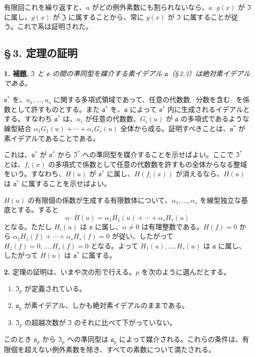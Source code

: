 有限回これを繰り返すと、$a$ がどの例外素数にも割られないなら、$a\cdot g(x)$ が $\mathfrak{I}$ に属し、$g(x)$ が $\mathfrak{Z}$ に属することから、常に $g(x)$ が $\mathfrak{I}$ に属することが従う。これで系は証明された。

\subsection*{\S\,3. 定理の証明}

\noindent\textbf{1. 補題.}
\emph{$\mathfrak{I}$ と $\mathfrak{o}$ の間の準同型を媒介する素イデアル $\mathfrak{a}$（\S\,2.3）は絶対素イデアルである。}

$\mathfrak{o}^*$ を、$u_1,\ldots,u_s$ に関する多項式領域であって、任意の代数数 --分数を含む-- を係数として許すものとする。また $\mathfrak{a}^*$ を、$\mathfrak{a}$ によって $\mathfrak{o}^*$ 内に生成されるイデアルとする。すなわち $\mathfrak{a}^*$ は、$\alpha_i$ が任意の代数数、$G_i(u)$ が $\mathfrak{a}$ の多項式であるような線型結合 $\alpha_1G_1(u)+\cdots+\alpha_sG_s(u)$ 全体から成る。証明すべきことは、$\mathfrak{a}^*$ が素イデアルであることである。

これは、$\mathfrak{a}^*$ が $\mathfrak{o}^*$ から $\mathfrak{I}^*$ への準同型を媒介することを示せばよい。ここで $\mathfrak{I}^*$ とは、$f_i(x)$ の多項式で係数として任意の代数数を許すもの全体からなる整域をいう。すなわち、$H(u)$ が $\mathfrak{o}^*$ に属し、$H(f_i(x))$ が消えるなら、$H(u)$ は $\mathfrak{a}^*$ に属することを示せばよい。

$H(u)$ の有限個の係数が生成する有限数体について、$\alpha_1,\ldots,\alpha_s$ を線型独立な基底とする。すると
\[
\alpha\cdot H(u)=\alpha_1H_1(u)+\cdots+\alpha_sH_s(u)
\]
となる。ただし $H_i(u)$ は $\mathfrak{o}$ に属し、$\alpha\ne0$ は有理整数である。$H(f)=0$ から
$\alpha_1H_1(f)+\cdots+\alpha_sH_s(f)=0$ が従い、したがって $H_1(f)=0,\ldots,H_s(f)=0$ となる。よって $H_1(u),\ldots,H_s(u)$ は $\mathfrak{a}$ に属し、したがって $H(u)$ は $\mathfrak{a}^*$ に属する。

\medskip\noindent\textbf{2.}
定理の証明は、いまや次の形で行える。$p$ を次のように選んだとする。
\begin{enumerate}
\item[I.] $\mathfrak{I}_p$ が定義されている。
\item[II.] $\mathfrak{a}_p$ が素イデアル、しかも絶対素イデアルのままである。
\item[III.] $\mathfrak{I}_p$ の超越次数が $\mathfrak{I}$ のそれに比べて下がっていない。
\end{enumerate}
このとき $\mathfrak{o}_p$ から $\mathfrak{I}_p$ への準同型は $\mathfrak{a}_p$ によって媒介される。これらの条件は、有限個を超えない例外素数を除き、すべての素数について満たされる。

